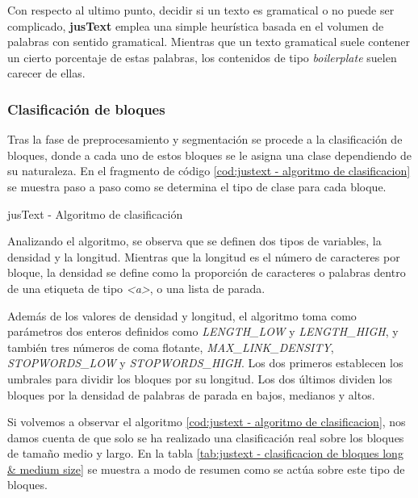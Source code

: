 Con respecto al ultimo punto, decidir si un texto es gramatical o no puede ser complicado, \textbf{jusText} 
emplea una simple heurística basada en el volumen de palabras con sentido gramatical. Mientras que un texto 
gramatical suele contener un cierto porcentaje de estas palabras, los contenidos de tipo \emph{boilerplate} 
suelen carecer de ellas.

\subsubsection{Clasificación de bloques}
\label{subsubsec:clasificacion de bloques}

Tras la fase de preprocesamiento y segmentación se procede a la clasificación de bloques, donde a cada uno
de estos bloques se le asigna una clase dependiendo de su naturaleza. En el fragmento de código 
\ref{cod:justext - algoritmo de clasificacion} se muestra paso a paso como se determina el tipo de clase 
para cada bloque.

\begin{codefloat}
  
  \caption{jusText - Algoritmo de clasificación}
  \label{cod:justext - algoritmo de clasificacion}
\end{codefloat}

Analizando el algoritmo, se observa que se definen dos tipos de variables, la densidad y la longitud. 
Mientras que la longitud es el número de caracteres por bloque, la densidad se define como la proporción 
de caracteres o palabras dentro de una etiqueta de tipo \emph{<a>}, o una lista de parada.

Además de los valores de densidad y longitud, el algoritmo toma como parámetros dos enteros definidos como
\emph{LENGTH\_LOW} y \emph{LENGTH\_HIGH}, y también tres números de coma flotante, \emph{MAX\_LINK\_DENSITY},
\emph{STOPWORDS\_LOW} y \emph{STOPWORDS\_HIGH}. Los dos primeros establecen los umbrales para dividir los 
bloques por su longitud. Los dos últimos dividen los bloques por la densidad de palabras de parada en bajos, 
medianos y altos.

Si volvemos a observar el algoritmo \ref{cod:justext - algoritmo de clasificacion}, nos damos cuenta de
que solo se ha realizado una clasificación real sobre los bloques de tamaño medio y largo. En la tabla
\ref{tab:justext - clasificacion de bloques long & medium size} se muestra a modo de resumen como se actúa 
sobre este tipo de bloques.

